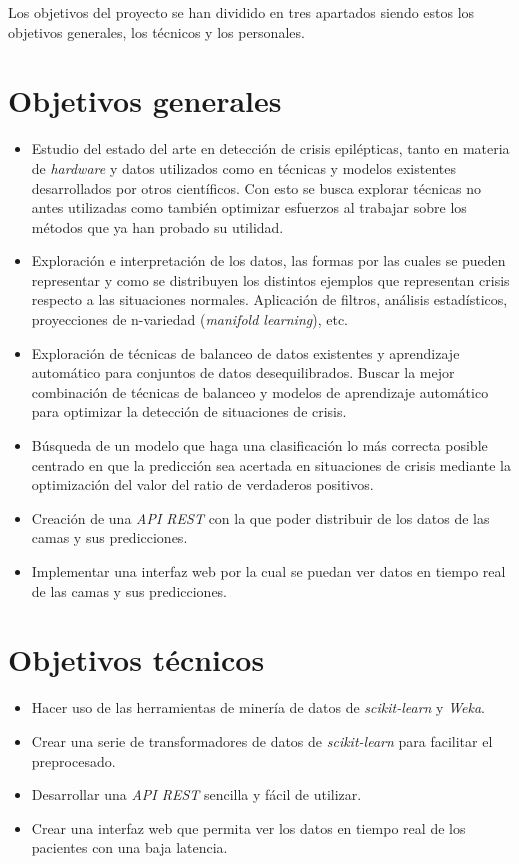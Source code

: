 
Los objetivos del proyecto se han dividido en tres apartados siendo estos los objetivos generales, los técnicos y los personales.

\section{Objetivos generales}

\begin{itemize}
	\item Estudio del estado del arte en detección de crisis epilépticas, tanto en materia de \textit{hardware} y datos utilizados como en técnicas y modelos existentes desarrollados por otros científicos. Con esto se busca explorar técnicas no antes utilizadas como también optimizar esfuerzos al trabajar sobre los métodos que ya han probado su utilidad.
	\item Exploración e interpretación de los datos, las formas por las cuales se pueden representar y como se distribuyen los distintos ejemplos que representan crisis respecto a las situaciones normales. Aplicación de filtros, análisis estadísticos, proyecciones de n-variedad (\textit{manifold learning}), etc.
	\item Exploración de técnicas de balanceo de datos existentes y aprendizaje automático para conjuntos de datos desequilibrados. Buscar la mejor combinación de técnicas de balanceo y modelos de aprendizaje automático para optimizar la detección de situaciones de crisis.
	\item Búsqueda de un modelo que haga una clasificación lo más correcta posible centrado en que la predicción sea acertada en situaciones de crisis mediante la optimización del valor del ratio de verdaderos positivos.
	\item Creación de una \textit{API REST} con la que poder distribuir de los datos de las camas y sus predicciones.
	\item Implementar una interfaz web por la cual se puedan ver datos en tiempo real de las camas y sus predicciones.
\end{itemize}

\section{Objetivos técnicos}

\begin{itemize}
	\item Hacer uso de las herramientas de minería de datos de \textit{scikit-learn} y \textit{Weka}.
	\item Crear una serie de transformadores de datos de \textit{scikit-learn} para facilitar el preprocesado.
	\item Desarrollar una \textit{API REST} sencilla y fácil de utilizar.
	\item Crear una interfaz web que permita ver los datos en tiempo real de los pacientes con una baja latencia.
\end{itemize}

